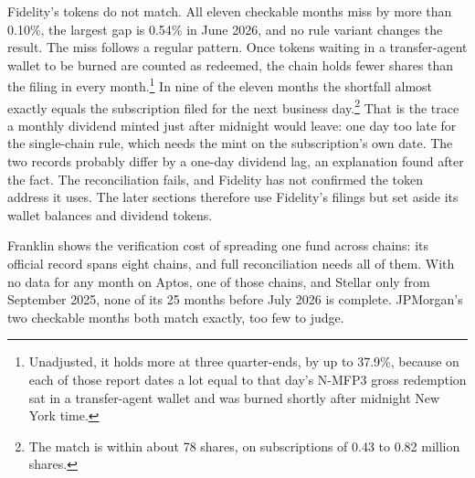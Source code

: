\documentclass[12pt,a4paper]{article}
\begin{document}
Fidelity's tokens do not match. All eleven checkable months miss by more than 0.10\%, the largest gap is 0.54\% in June 2026, and no rule variant changes the result.
The miss follows a regular pattern. Once tokens waiting in a transfer-agent wallet to be burned are counted as redeemed, the chain holds fewer shares than the filing in every month.\footnote{Unadjusted, it holds more at three quarter-ends, by up to 37.9\%, because on each of those report dates a lot equal to that day's \mbox{N-MFP3} gross redemption sat in a transfer-agent wallet and was burned shortly after midnight New York time.}
In nine of the eleven months the shortfall almost exactly equals the subscription filed for the next business day.\footnote{The match is within about 78 shares, on subscriptions of 0.43 to 0.82 million shares.} That is the trace a monthly dividend minted just after midnight would leave: one day too late for the single-chain rule, which needs the mint on the subscription's own date. The two records probably differ by a one-day dividend lag, an explanation found after the fact. The reconciliation fails, and Fidelity has not confirmed the token address it uses. The later sections therefore use Fidelity's filings but set aside its wallet balances and dividend tokens.

Franklin shows the verification cost of spreading one fund across chains: its official record spans eight chains, and full reconciliation needs all of them. With no data for any month on Aptos, one of those chains, and Stellar only from September 2025, none of its 25 months before July 2026 is complete. JPMorgan's two checkable months both match exactly, too few to judge.
\end{document}
